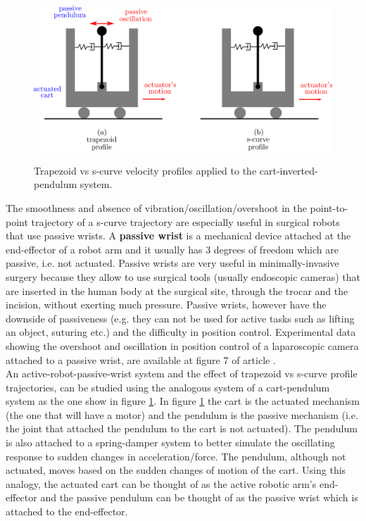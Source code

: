 \begin{center}
\begin{figure}[!htb]
\centering
\includegraphics[width=\textwidth]{images/cart-pendulum-passive-wrist-analogy.png}\\
\caption{Trapezoid vs s-curve velocity profiles applied to the cart-inverted-pendulum system.} 
\label{cart-pendulum-passive-wrist-analogy}
\end{figure}
\end{center}

The smoothness and absence of vibration/oscillation/overshoot in the point-to-point trajectory of a s-curve trajectory are especially useful in surgical robots that use passive wrists. A \textbf{passive wrist} is a mechanical 
device attached at the end-effector of a robot arm and it usually has 3 degrees of freedom which are passive, i.e. not actuated. Passive wrists are very useful in minimally-invasive surgery because they allow to use surgical 
tools (usually endoscopic cameras) that are inserted in the human body at the surgical site, through the trocar and the incision, without exerting much pressure. Passive wrists, however have the downside of passiveness 
(e.g. they can not be used for active tasks such as lifting an object, suturing etc.) and the difficulty in position control. Experimental data showing the overshoot and oscillation in position control of a
laparoscopic camera attached to a passive wrist, are available at figure 7 of article \cite{Bauzano2009ControlMF}.\\

An active-robot-passive-wrist system and the effect of trapezoid vs s-curve profile trajectories, can be studied using the analogous system of a cart-pendulum system as the one show in figure \ref{cart-pendulum-passive-wrist-analogy}. 
In figure \ref{cart-pendulum-passive-wrist-analogy} the cart is the actuated mechanism (the one that will have a motor) and the pendulum is the passive mechanism (i.e. the joint that attached the pendulum to the cart 
is not actuated). The pendulum is also attached to a spring-damper system to better simulate the oscillating response to sudden changes in acceleration/force. The pendulum, although not actuated, moves based on the sudden 
changes of motion of the cart. Using this analogy, the actuated cart can be thought of as the active robotic arm's end-effector and the passive pendulum can be thought of as the passive wrist which is attached to the 
end-effector.\\


